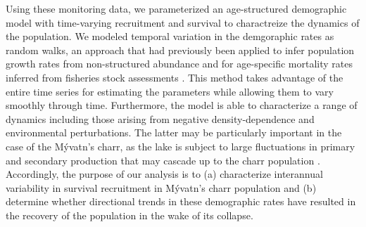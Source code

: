 Using these monitoring data, 
we parameterized an age-structured demographic model with time-varying recruitment and survival 
to charactreize the dynamics of the population.
We modeled temporal variation in the demgoraphic rates as random walks, 
an approach that had previously been applied 
to infer population growth rates from non-structured abundance 
\citep{zeng1998}
and for age-specific mortality rates inferred from fisheries stock assessments 
\citep{nielsen2014estimation}. 
This method takes advantage of the entire time series for estimating the parameters 
while allowing them to vary smoothly through time. 
Furthermore, the model is able to characterize a range of dynamics including those
arising from negative density-dependence and environmental perturbations.
The latter may be particularly important in the case of the M\'{y}vatn's charr,
as the lake is subject to large fluctuations in primary and secondary production
that may cascade up to the charr population 
\citep{einarsson2004myvatn, einarsson2004clad, gardarsson2004population}.
Accordingly, the purpose of our analysis is to 
(a) characterize interannual variability in survival recruitment 
in M\'{y}vatn's charr population 
and (b) determine whether directional trends in these demographic rates have
resulted in the recovery of the population in the wake of its collapse. 
